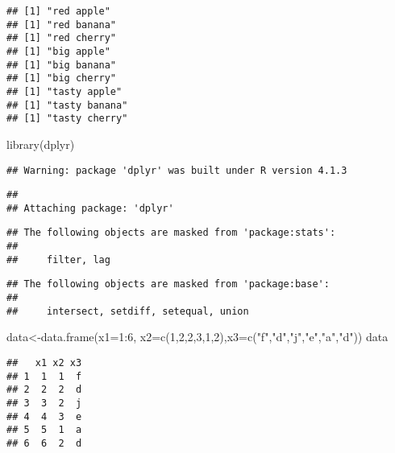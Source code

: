 \documentclass[
]{article}
\newenvironment{Shaded}{\begin{snugshade}}{\end{snugshade}}
\newcommand{\AttributeTok}[1]{\textcolor[rgb]{0.77,0.63,0.00}{#1}}
\newcommand{\DecValTok}[1]{\textcolor[rgb]{0.00,0.00,0.81}{#1}}
\newcommand{\FunctionTok}[1]{\textcolor[rgb]{0.00,0.00,0.00}{#1}}
\newcommand{\NormalTok}[1]{#1}
\newcommand{\OtherTok}[1]{\textcolor[rgb]{0.56,0.35,0.01}{#1}}
\newcommand{\SpecialCharTok}[1]{\textcolor[rgb]{0.00,0.00,0.00}{#1}}
\newcommand{\StringTok}[1]{\textcolor[rgb]{0.31,0.60,0.02}{#1}}
\begin{document}
\begin{verbatim}
## [1] "red apple"
## [1] "red banana"
## [1] "red cherry"
## [1] "big apple"
## [1] "big banana"
## [1] "big cherry"
## [1] "tasty apple"
## [1] "tasty banana"
## [1] "tasty cherry"
\end{verbatim}

\begin{Shaded}
\begin{Highlighting}[]
\FunctionTok{library}\NormalTok{(dplyr)}
\end{Highlighting}
\end{Shaded}

\begin{verbatim}
## Warning: package 'dplyr' was built under R version 4.1.3
\end{verbatim}

\begin{verbatim}
## 
## Attaching package: 'dplyr'
\end{verbatim}

\begin{verbatim}
## The following objects are masked from 'package:stats':
## 
##     filter, lag
\end{verbatim}

\begin{verbatim}
## The following objects are masked from 'package:base':
## 
##     intersect, setdiff, setequal, union
\end{verbatim}

\begin{Shaded}
\begin{Highlighting}[]
\NormalTok{data}\OtherTok{\textless{}{-}}\FunctionTok{data.frame}\NormalTok{(}\AttributeTok{x1=}\DecValTok{1}\SpecialCharTok{:}\DecValTok{6}\NormalTok{, }\AttributeTok{x2=}\FunctionTok{c}\NormalTok{(}\DecValTok{1}\NormalTok{,}\DecValTok{2}\NormalTok{,}\DecValTok{2}\NormalTok{,}\DecValTok{3}\NormalTok{,}\DecValTok{1}\NormalTok{,}\DecValTok{2}\NormalTok{),}\AttributeTok{x3=}\FunctionTok{c}\NormalTok{(}\StringTok{"f"}\NormalTok{,}\StringTok{"d"}\NormalTok{,}\StringTok{"j"}\NormalTok{,}\StringTok{"e"}\NormalTok{,}\StringTok{"a"}\NormalTok{,}\StringTok{"d"}\NormalTok{))}
\NormalTok{data}
\end{Highlighting}
\end{Shaded}

\begin{verbatim}
##   x1 x2 x3
## 1  1  1  f
## 2  2  2  d
## 3  3  2  j
## 4  4  3  e
## 5  5  1  a
## 6  6  2  d
\end{verbatim}
\end{document}

